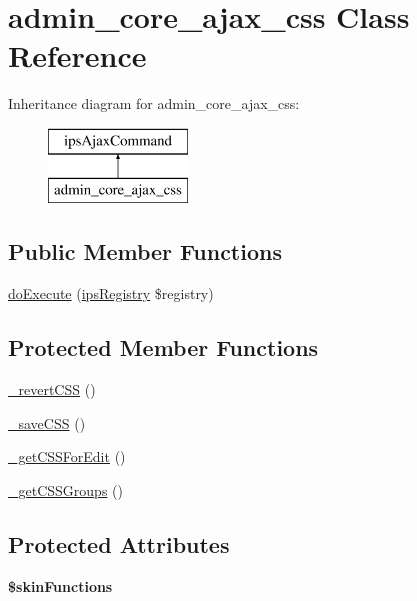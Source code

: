 \hypertarget{classadmin__core__ajax__css}{\section{admin\-\_\-core\-\_\-ajax\-\_\-css Class Reference}
\label{classadmin__core__ajax__css}
}
Inheritance diagram for admin\-\_\-core\-\_\-ajax\-\_\-css\-:\begin{figure}[H]
\begin{center}
\leavevmode
\includegraphics[height=2.000000cm]{classadmin__core__ajax__css}
\end{center}
\end{figure}
\subsection*{Public Member Functions}
\begin{DoxyCompactItemize}
\item 
\hyperlink{classadmin__core__ajax__css_afbc4e912a0604b94d47d66744c64d8ba}{do\-Execute} (\hyperlink{classips_registry}{ips\-Registry} \$registry)
\end{DoxyCompactItemize}
\subsection*{Protected Member Functions}
\begin{DoxyCompactItemize}
\item 
\hyperlink{classadmin__core__ajax__css_a8f1b6a6fa20bd9263069c439f10f73a0}{\-\_\-revert\-C\-S\-S} ()
\item 
\hyperlink{classadmin__core__ajax__css_ac4d26aa72d3a046aa1e0569845eef81b}{\-\_\-save\-C\-S\-S} ()
\item 
\hyperlink{classadmin__core__ajax__css_a91488df2250741cff88686fc00784f11}{\-\_\-get\-C\-S\-S\-For\-Edit} ()
\item 
\hyperlink{classadmin__core__ajax__css_a6451740c3c6840a232661e85a120aaa4}{\-\_\-get\-C\-S\-S\-Groups} ()
\end{DoxyCompactItemize}
\subsection*{Protected Attributes}
\begin{DoxyCompactItemize}
\item 
\hypertarget{classadmin__core__ajax__css_a41d90687021c6f16184b43666509dee8}{{\bfseries \$skin\-Functions}}\label{classadmin__core__ajax__css_a41d90687021c6f16184b43666509dee8}

\end{DoxyCompactItemize}


